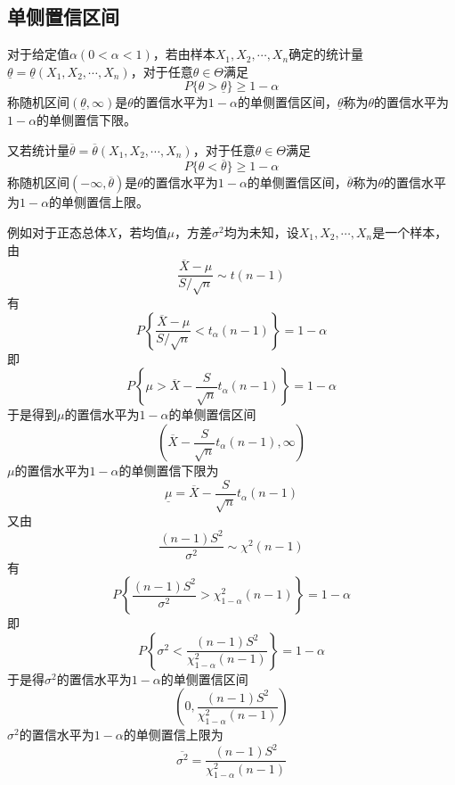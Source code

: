 \subsection{单侧置信区间}
    \begin{definition}
        对于给定值$\alpha(0<\alpha<1)$，若由样本$X_1,X_2,\cdots,X_n$确定的统计量$\underline{\theta}=\underline{\theta}(X_1,X_2,\cdots,X_n)$，对于任意$\theta\in \varTheta$满足
        $$P\{\theta>\underline{\theta}\}\geq 1-\alpha$$
        称随机区间$(\underline{\theta},\infty)$是$\theta$的置信水平为$1-\alpha$的{\heiti 单侧置信区间}，$\underline{\theta}$称为$\theta$的置信水平为$1-\alpha$的{\heiti 单侧置信下限}。

        又若统计量$\overline{\theta}=\overline{\theta}(X_1,X_2,\cdots,X_n)$，对于任意$\theta\in \varTheta$满足
        $$P\{\theta<\overline{\theta}\}\geq 1-\alpha$$
        称随机区间$(-\infty,\overline{\theta})$是$\theta$的置信水平为$1-\alpha$的{\heiti 单侧置信区间}，$\overline{\theta}$称为$\theta$的置信水平为$1-\alpha$的{\heiti 单侧置信上限}。

        例如对于正态总体$X$，若均值$\mu$，方差$\sigma^2$均为未知，设$X_1,X_2,\cdots,X_n$是一个样本，由
        $$\frac{\overline{X}-\mu}{S/\sqrt{n}}\sim t(n-1)$$
        有$$P\left\{\frac{\overline{X}-\mu}{S/\sqrt{n}}<t_\alpha(n-1)\right\}=1-\alpha$$
        即$$P\left\{\mu>\overline{X}-\frac{S}{\sqrt{n}}t_\alpha(n-1)\right\}=1-\alpha$$
        于是得到$\mu$的置信水平为$1-\alpha$的单侧置信区间
        $$\left(\overline{X}-\frac{S}{\sqrt{n}}t_\alpha(n-1),\infty\right)$$
        $\mu$的置信水平为$1-\alpha$的单侧置信下限为
        $$\underline{\mu}=\overline{X}-\frac{S}{\sqrt{n}}t_\alpha(n-1)$$
        又由$$\frac{(n-1)S^2}{\sigma^2}\sim \chi^2(n-1)$$
        有
        $$P\left\{\frac{(n-1)S^2}{\sigma^2}>\chi_{1-\alpha}^2(n-1)\right\}=1-\alpha$$
        即
        $$P\left\{\sigma^2<\frac{(n-1)S^2}{\chi_{1-\alpha}^2(n-1)}\right\}=1-\alpha$$
        于是得$\sigma^2$的置信水平为$1-\alpha$的单侧置信区间
        $$\left(0,\frac{(n-1)S^2}{\chi_{1-\alpha}^2(n-1)}\right)$$
        $\sigma^2$的置信水平为$1-\alpha$的单侧置信上限为
        $$\overline{\sigma^2}=\frac{(n-1)S^2}{\chi_{1-\alpha}^2(n-1)}$$
    \end{definition}

    
